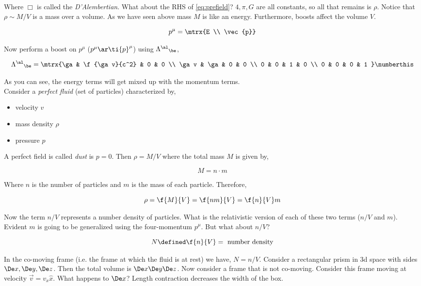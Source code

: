 \documentclass{article}
\begin{document}
Where $\Box$ is called the \textit{D'Alembertian}. What about the RHS of \eqref{eq:prefield}? $4,\pi,G$ are all constants, so all that remains is $\rho$. Notice that $\rho \sim M / V$ is a mass over a volume. As we have seen above mass $M$ is like an energy. Furthermore, boosts affect the volume $V$.

\[ p^\mu= \mtrx{E \\ \vec{p}} \]

Now perform a boost on $p^\mu$ ($p^\mu \ar \ti{p}^\mu$) using ${\Lam^{\al}}_\be$,

\[ {\Lam^{\al}}_\be = \mtrx{\ga & \f{\ga v}{c^2} & 0 & 0 \\ \ga v & \ga & 0 & 0  \\ 0 & 0 & 1 & 0  \\ 0 & 0 & 0 & 1 } \numberthis \label{eq:boost} \]

As you can see, the energy terms will get mixed up with the momentum terms. \\

Consider a \textit{perfect fluid} (set of particles) characterized by,
\begin{itemize}
    \item velocity $v$
    \item mass density $\rho$
    \item pressure $p$
\end{itemize}

A perfect field is called \textit{dust} is $p = 0$. Then $\rho = M/V$ where the total mass $M$ is given by,

\[ M = n \cdot m \]

Where $n$ is the number of particles and $m$ is the mass of each particle. Therefore,

\[ \rho = \f{M}{V} = \f{nm}{V} = \f{n}{V} m \]

Now the term $n/V$ represents a number density of particles. What is the relativistic version of each of these two terms ($n/V$ and $m$). Evident $m$ is going to be generalized using the four-momentum $p^\mu$. But what about $n/V$?

\[ N \defined \f{n}{V} = \text{ number density} \]

In the co-moving frame (i.e. the frame at which the fluid is at rest) we have, $N = n/V$. Consider a rectangular prism in 3d space with sides $\De x, \De y, \De z$. Then the total volume is $\De x\De y\De z$. Now consider a frame that is not co-moving. Consider this frame moving at velocity $\vec{v} = v_x \hat{x}$. What happens to $\De x$? Length contraction decreases the width of the box.
\end{document}
